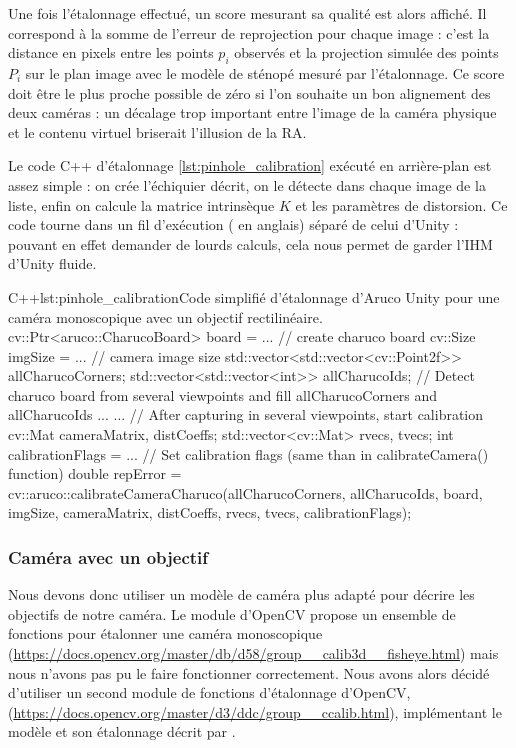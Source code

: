 
Une fois l'étalonnage effectué, un score mesurant sa qualité est alors affiché. Il correspond à la somme de l'erreur de reprojection pour chaque image : c'est la distance en pixels entre les points $p_i$ observés et la projection simulée des points $P_i$ sur le plan image avec le modèle de sténopé mesuré par l'étalonnage. Ce score doit être le plus proche possible de zéro si l'on souhaite un bon alignement des deux caméras : un décalage trop important entre l'image de la caméra physique et le contenu virtuel briserait l'illusion de la RA.

Le code C++ d'étalonnage \ref{lst:pinhole_calibration} exécuté en arrière-plan est assez simple : on crée l'échiquier décrit, on le détecte dans chaque image de la liste, enfin on calcule la matrice intrinsèque $K$ et les paramètres de distorsion. Ce code tourne dans un fil d'exécution ( en anglais) séparé de celui d'Unity : pouvant en effet demander de lourds calculs, cela nous permet de garder l'IHM d'Unity fluide.

\begin{listingETS}{C++}{lst:pinhole_calibration}{Code simplifié d'étalonnage d'Aruco Unity pour une caméra monoscopique avec un objectif rectilinéaire.}
  cv::Ptr<aruco::CharucoBoard> board = ... // create charuco board
  cv::Size imgSize = ... // camera image size
  std::vector<std::vector<cv::Point2f>> allCharucoCorners;
  std::vector<std::vector<int>> allCharucoIds;
  // Detect charuco board from several viewpoints and fill allCharucoCorners and allCharucoIds
  ...
  ...
  // After capturing in several viewpoints, start calibration
  cv::Mat cameraMatrix, distCoeffs;
  std::vector<cv::Mat> rvecs, tvecs;
  int calibrationFlags = ... // Set calibration flags (same than in calibrateCamera() function)
  double repError = cv::aruco::calibrateCameraCharuco(allCharucoCorners, allCharucoIds, board, imgSize, cameraMatrix, distCoeffs, rvecs, tvecs, calibrationFlags);
\end{listingETS}


\subsubsection{Caméra avec un objectif }
Nous devons donc utiliser un modèle de caméra plus adapté pour décrire les objectifs de notre caméra. Le module  d'OpenCV propose un ensemble de fonctions pour étalonner une caméra monoscopique  (\url{https://docs.opencv.org/master/db/d58/group__calib3d__fisheye.html}) mais nous n'avons pas pu le faire fonctionner correctement. Nous avons alors décidé d'utiliser un second module de fonctions d'étalonnage d'OpenCV,  (\url{https://docs.opencv.org/master/d3/ddc/group__ccalib.html}), implémentant le modèle et son étalonnage décrit par \cite{Mei2007}.

